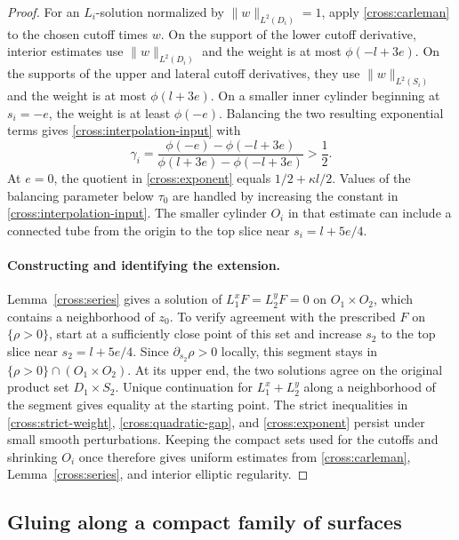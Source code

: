 \documentclass[11pt,a4paper]{article}
\theoremstyle{definition}
\theoremstyle{remark}
\numberwithin{equation}{section}
\begin{document}
\begin{proof}
For an $L_i$-solution normalized by $\|w\|_{L^2(D_i)}=1$, apply
\eqref{cross:carleman} to the chosen cutoff times $w$.
On the support of the lower cutoff derivative, interior estimates use
$\|w\|_{L^2(D_i)}$ and the weight is at most $\phi(-l+3e)$.
On the supports of the upper and lateral cutoff derivatives, they use
$\|w\|_{L^2(S_i)}$ and the weight is at most $\phi(l+3e)$.
On a smaller inner cylinder beginning at $s_i=-e$, the weight is at
least $\phi(-e)$. Balancing the two resulting exponential terms gives
\eqref{cross:interpolation-input} with
\begin{equation}\label{cross:exponent}
 \gamma_i=
 \frac{\phi(-e)-\phi(-l+3e)}{
       \phi(l+3e)-\phi(-l+3e)}>\frac12.
\end{equation}
At $e=0$, the quotient in \eqref{cross:exponent} equals
$1/2+\kappa l/2$. Values of the balancing parameter below $\tau_0$
are handled by increasing the constant in
\eqref{cross:interpolation-input}. The smaller cylinder $O_i$ in
that estimate can include a connected tube from the origin to the
top slice near $s_i=l+5e/4$.

\paragraph{Constructing and identifying the extension.}
Lemma~\ref{cross:series} gives a solution of $L_1^xF=L_2^yF=0$
on $O_1\times O_2$, which contains a neighborhood of $z_0$.
To verify agreement with the prescribed $F$ on $\{\rho>0\}$,
start at a sufficiently close point of this set and increase $s_2$
to the top slice near $s_2=l+5e/4$. Since $\partial_{s_2}\rho>0$
locally, this segment stays in $\{\rho>0\}\cap(O_1\times O_2)$.
At its upper end, the two solutions agree on the original product
set $D_1\times S_2$. Unique continuation for $L_1^x+L_2^y$ along
a neighborhood of the segment gives equality at the starting point.
The strict inequalities in \eqref{cross:strict-weight},
\eqref{cross:quadratic-gap}, and \eqref{cross:exponent} persist under
small smooth perturbations. Keeping the compact sets used for the
cutoffs and shrinking $O_i$ once therefore gives uniform estimates
from \eqref{cross:carleman}, Lemma~\ref{cross:series}, and interior
elliptic regularity.
\end{proof}

\subsection{Gluing along a compact family of surfaces}
\end{document}
